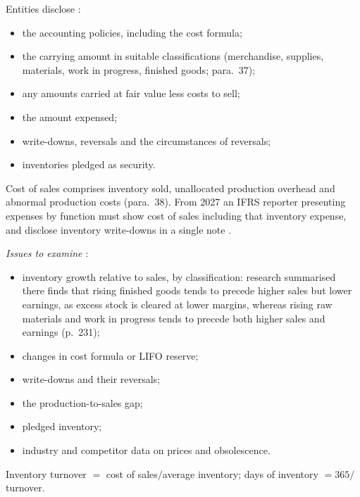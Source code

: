 \begin{qfmethod}\label{meth:inventory-disclosure-analysis}
 Entities disclose \citep[IAS~2 para.~36]{eu-2023-1803-ias2}:
\begin{itemize}
\item the accounting policies, including the cost formula;
\item the carrying amount in suitable classifications (merchandise, supplies, materials, work in progress, finished goods; para.~37);
\item any amounts carried at fair value less costs to sell;
\item the amount expensed;
\item write-downs, reversals and the circumstances of reversals;
\item inventories pledged as security.
\end{itemize}
Cost of sales comprises inventory sold, unallocated production overhead and abnormal production costs (para.~38). From 2027 an IFRS reporter presenting expenses by function must show cost of sales including that inventory expense, and disclose inventory write-downs in a single note \citep[Annex, IFRS~18 paras.~82--83]{eu-2026-338-ifrs18}.

\emph{Issues to examine} \citep[pp.~228--236]{financial-statement-analysis-2009}:
\begin{itemize}
\item inventory growth relative to sales, by classification: research summarised there finds that rising finished goods tends to precede higher sales but lower earnings, as excess stock is cleared at lower margins, whereas rising raw materials and work in progress tends to precede both higher sales and earnings (p.~231);
\item changes in cost formula or LIFO reserve;
\item write-downs and their reversals;
\item the production-to-sales gap;
\item pledged inventory;
\item industry and competitor data on prices and obsolescence.
\end{itemize}

 Inventory turnover $=$ cost of sales$/$average inventory; days of inventory $=365/$turnover.


\end{qfmethod}
